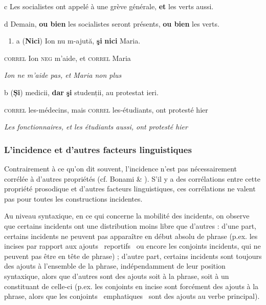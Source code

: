   c  Les socialistes ont appelé à une grève générale, \textbf{et} les verts aussi.

  d  Demain, \textbf{ou bien} les socialistes seront présents, \textbf{ou bien} les verts.


\begin{enumerate}
\item \label{bkm:Ref301718240}a  (\textbf{Nici})  Ion  nu  m-ajută,  \textbf{şi}  \textbf{nici}  Maria.


\end{enumerate}
\textsc{correl}  Ion  \textsc{neg } m'aide,  et  \textsc{correl}  Maria 

{\itshape
Ion ne m'aide pas, et Maria non plus}

  b  (\textbf{Și})  medicii,  \textbf{dar}  \textbf{şi}  studenții,  au  protestat  ieri.

    \textsc{correl}  les-médecins,  mais  \textsc{correl}  les-étudiants,  ont  protesté  hier

    \textit{Les fonctionnaires, et les étudiants aussi, ont protesté hier}

\subsubsection{L'incidence et d'autres facteurs linguistiques}
\label{bkm:Ref302039778}Contrairement à ce qu'on dit souvent, l'incidence n'est pas nécessairement corrélée à d'autres propriétés (cf. Bonami \& \citet{Godard2008a}). S'il y a des corrélations entre cette propriété prosodique et d'autres facteurs linguistiques, ces corrélations ne valent pas pour toutes les constructions incidentes. 

Au niveau syntaxique, en ce qui concerne la mobilité des incidents, on observe que certains incidents ont une distribution moins libre que d'autres : d'une part, certains incidents ne peuvent pas apparaître en début absolu de phrase (p.ex. les incises par rapport aux ajouts {\guillemotleft}~reportifs~{\guillemotright} ou encore les conjoints incidents, qui ne peuvent pas être en tête de phrase) ; d'autre part, certains incidents sont toujours des ajouts à l'ensemble de la phrase, indépendamment de leur position syntaxique, alors que d'autres sont des ajouts soit à la phrase, soit à un constituant de celle-ci (p.ex. les conjoints en incise sont forcément des ajouts à la phrase, alors que les conjoints {\guillemotleft}~emphatiques~{\guillemotright} sont des ajouts au verbe principal). 

